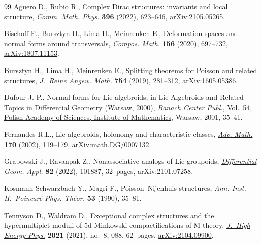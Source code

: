 \documentclass[11pt]{article}
\numberwithin{equation}{section}
\numberwithin{equation}{section}
\begin{document}
\begin{thebibliography}{99}
Aguero D., Rubio R., Complex {D}irac structures: invariants and local
 structure, \href{https://doi.org/10.1007/s00220-022-04471-1}{\textit{Comm.
 Math. Phys.}} \textbf{396} (2022), 623--646,
 \href{http://arxiv.org/abs/2105.05265}{arXiv:2105.05265}.

Bischoff F., Bursztyn H., Lima H., Meinrenken E., Deformation spaces and normal
 forms around transversals,
 \href{https://doi.org/10.1112/s0010437x1900784x}{\textit{Compos. Math.}}
 \textbf{156} (2020), 697--732,
 \href{http://arxiv.org/abs/1807.11153}{arXiv:1807.11153}.

Bursztyn H., Lima H., Meinrenken E., Splitting theorems for {P}oisson and
 related structures,
 \href{https://doi.org/10.1515/crelle-2017-0014}{\textit{J.~Reine Angew.
 Math.}} \textbf{754} (2019), 281--312,
 \href{http://arxiv.org/abs/1605.05386}{arXiv:1605.05386}.

Dufour J.-P., Normal forms for {L}ie algebroids, in Lie Algebroids and Related
 Topics in Differential Geometry ({W}arsaw, 2000), \textit{Banach Center
 Publ.}, Vol.~54, \href{https://doi.org/10.4064/bc54-0-3}{Polish Academy of
 Sciences, Institute of Mathematics}, Warsaw, 2001, 35--41.

Fernandes R.L., Lie algebroids, holonomy and characteristic classes,
 \href{https://doi.org/10.1006/aima.2001.2070}{\textit{Adv. Math.}}
 \textbf{170} (2002), 119--179,
 \href{http://arxiv.org/abs/math.DG/0007132}{arXiv:math.DG/0007132}.

Grabowski J., Ravanpak Z., Nonassociative analogs of {L}ie groupoids,
 \href{https://doi.org/10.1016/j.difgeo.2022.101887}{\textit{Differential
 Geom. Appl.}} \textbf{82} (2022), 101887, 32~pages,
 \href{http://arxiv.org/abs/2101.07258}{arXiv:2101.07258}.

Kosmann-Schwarzbach Y., Magri F., Poisson--{N}ijenhuis structures, \textit{Ann.
 Inst. H.~Poincar\'e Phys. Th\'eor.} \textbf{53} (1990), 35--81.

Tennyson D., Waldram D., Exceptional complex structures and the hypermultiplet
 moduli of 5d {M}inkowski compactifications of {M}-theory,
 \href{https://doi.org/10.1007/jhep08(2021)088}{\textit{J.~High Energy Phys.}}
 \textbf{2021} (2021), no.~8, 088, 62~pages,
 \href{http://arxiv.org/abs/2104.09900}{arXiv:2104.09900}.

\end{thebibliography}
\end{document}
